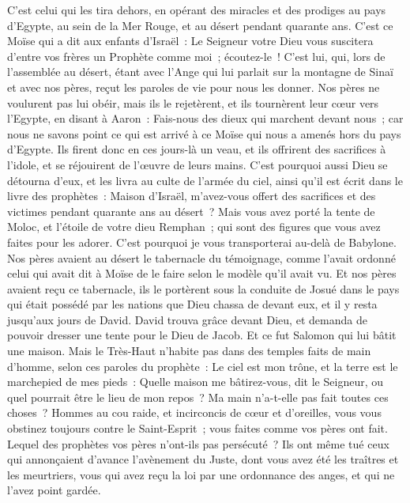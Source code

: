 \begin{multicols}{2}
C'est celui qui les tira dehors, en opérant des miracles et des prodiges au pays d'Egypte, au sein de la Mer Rouge, et au désert pendant quarante ans.
C'est ce Moïse qui a dit aux enfants d'Israël~: Le Seigneur votre Dieu vous suscitera d'entre vos frères un Prophète comme moi~; écoutez-le~!
C'est lui, qui, lors de l'assemblée au désert, étant avec l'Ange qui lui parlait sur la montagne de Sinaï et avec nos pères, reçut les paroles de vie pour nous les donner.
Nos pères ne voulurent pas lui obéir, mais ils le rejetèrent, et ils tournèrent leur cœur vers l'Egypte,
en disant à Aaron~: Fais-nous des dieux qui marchent devant nous~; car nous ne savons point ce qui est arrivé à ce Moïse qui nous a amenés hors du pays d'Egypte.
Ils firent donc en ces jours-là un veau, et ils offrirent des sacrifices à l'idole, et se réjouirent de l'œuvre de leurs mains.
C'est pourquoi aussi Dieu se détourna d'eux, et les livra au culte de l'armée du ciel, ainsi qu'il est écrit dans le livre des prophètes~: Maison d'Israël, m'avez-vous offert des sacrifices et des victimes pendant quarante ans au désert~?
Mais vous avez porté la tente de Moloc, et l'étoile de votre dieu Remphan~; qui sont des figures que vous avez faites pour les adorer. C'est pourquoi je vous transporterai au-delà de Babylone.
Nos pères avaient au désert le tabernacle du témoignage, comme l'avait ordonné celui qui avait dit à Moïse de le faire selon le modèle qu'il avait vu.
Et nos pères avaient reçu ce tabernacle, ils le portèrent sous la conduite de Josué dans le pays qui était possédé par les nations que Dieu chassa de devant eux, et il y resta jusqu'aux jours de David.
David trouva grâce devant Dieu, et demanda de pouvoir dresser une tente pour le Dieu de Jacob.
Et ce fut Salomon qui lui bâtit une maison.
Mais le Très-Haut n'habite pas dans des temples faits de main d'homme, selon ces paroles du prophète~:
Le ciel est mon trône, et la terre est le marchepied de mes pieds~: Quelle maison me bâtirez-vous, dit le Seigneur, ou quel pourrait être le lieu de mon repos~?
Ma main n'a-t-elle pas fait toutes ces choses~?
Hommes au cou raide, et incirconcis de cœur et d'oreilles, vous vous obstinez toujours contre le Saint-Esprit~; vous faites comme vos pères ont fait.
Lequel des prophètes vos pères n'ont-ils pas persécuté~? Ils ont même tué ceux qui annonçaient d'avance l'avènement du Juste, dont vous avez été les traîtres et les meurtriers,
vous qui avez reçu la loi par une ordonnance des anges, et qui ne l'avez point gardée.

\end{multicols}
